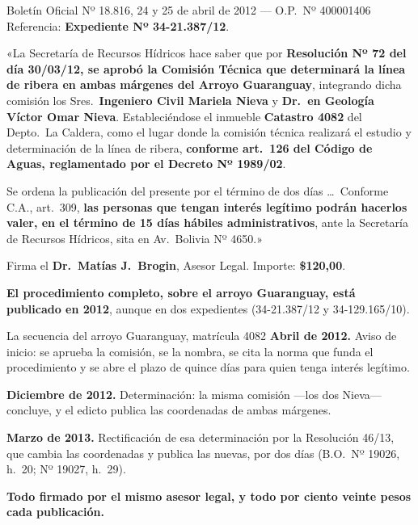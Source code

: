 \begin{ficha}{Boletín Oficial Nº 18.816, 24 y 25 de abril de 2012 --- O.P.\ Nº 400001406}
Referencia: \textbf{Expediente Nº 34-21.387/12}.

«La Secretaría de Recursos Hídricos hace saber que por \textbf{Resolución Nº 72 del día
30/03/12, se aprobó la Comisión Técnica que determinará la línea de ribera en ambas márgenes
del Arroyo Guaranguay}, integrando dicha comisión los Sres.\ \textbf{Ingeniero Civil Mariela
Nieva} y \textbf{Dr.\ en Geología Víctor Omar Nieva}. Estableciéndose el inmueble
\textbf{Catastro 4082} del Depto.\ La Caldera, como el lugar donde la comisión técnica realizará
el estudio y determinación de la línea de ribera, \textbf{conforme art.\ 126 del Código de
Aguas, reglamentado por el Decreto Nº 1989/02}.

Se ordena la publicación del presente por el término de dos días \ldots\ Conforme C.A., art.\
309, \textbf{las personas que tengan interés legítimo podrán hacerlos valer, en el término de 15
días hábiles administrativos}, ante la Secretaría de Recursos Hídricos, sita en Av.\ Bolivia
Nº 4650.»

Firma el \textbf{Dr.\ Matías J.\ Brogin}, Asesor Legal. Importe: \textbf{\$120,00}.
\end{ficha}

\textbf{El procedimiento completo, sobre el arroyo Guaranguay, está publicado en 2012}, aunque en dos expedientes (34-21.387/12 y 34-129.165/10).

\begin{ficha}{La secuencia del arroyo Guaranguay, matrícula 4082}
\textbf{Abril de 2012.} Aviso de inicio: se aprueba la comisión, se la nombra, se cita la norma
que funda el procedimiento y se abre el plazo de quince días para quien tenga interés legítimo.

\textbf{Diciembre de 2012.} Determinación: la misma comisión ---los dos Nieva--- concluye, y el
edicto publica las coordenadas de ambas márgenes.

\textbf{Marzo de 2013.} Rectificación de esa determinación por la Resolución 46/13, que cambia las coordenadas y publica las nuevas, por dos días (B.O.\ Nº 19026, h.\ 20; Nº 19027, h.\ 29).

\textbf{Todo firmado por el mismo asesor legal, y todo por ciento veinte pesos cada
publicación.}
\end{ficha}

